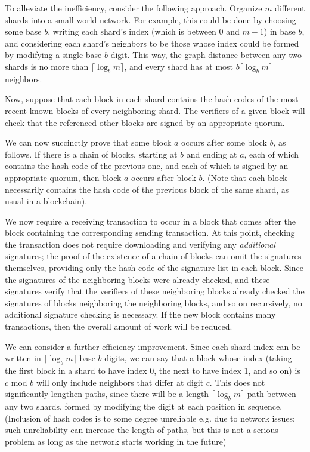 \documentclass{article}
\begin{document}
To alleviate the inefficiency, consider the following approach.  Organize $m$
different shards into a small-world network.  For example, this could be done
by choosing some base $b$, writing each shard's index (which is between 0 and
$m-1$) in base $b$, and considering each shard's neighbors to be those whose
index could be formed by modifying a single base-$b$ digit.  This way, the
graph distance between any two shards is no more than $\lceil \log_b m \rceil$,
and every shard has at most $b \lceil \log_b m \rceil$ neighbors.

Now, suppose that each block in each shard contains the hash codes of the most
recent known blocks of every neighboring shard.  The verifiers of a given block
will check that the referenced other blocks are signed by an appropriate
quorum.  

We can now succinctly prove that some block $a$ occurs after some block $b$, as
follows.  If there is a chain of blocks, starting at $b$ and ending at $a$,
each of which contains the hash code of the previous one, and each of which is
signed by an appropriate quorum, then block $a$ occurs after block $b$.  (Note
that each block necessarily contains the hash code of the previous block of the
same shard, as usual in a blockchain).

We now require a receiving transaction to occur in a block that comes after the
block containing the corresponding sending transaction.
At this point, checking the transaction does not require downloading and
verifying any \textit{additional} signatures; the proof of the existence of a
chain of blocks can omit the signatures themselves, providing only the hash
code of the signature list in each block.  Since the signatures of the
neighboring blocks were already checked, and these signatures verify that the
verifiers of these neighboring blocks already checked the signatures of blocks
neighboring the neighboring blocks, and so on recursively, no additional
signature checking is necessary.
If the new block contains many transactions, then the overall amount of work
will be reduced.

We can consider a further efficiency improvement.  Since each shard index can
be written in $\lceil \log_b m\rceil$ base-$b$ digits, we can say that a block
whose index (taking the first block in a shard to have index 0, the next to
have index 1, and so on) is $c$ mod $b$ will only include neighbors that differ
at digit $c$.  This does not significantly lengthen paths, since there will be
a length $\lceil \log_b m \rceil$ path between any two shards, formed by
modifying the digit at each position in sequence.  (Inclusion of hash codes
is to some degree unreliable e.g. due to network issues; such unreliability
can increase the length of paths, but this is not a serious problem as long
as the network starts working in the future)
\end{document}
